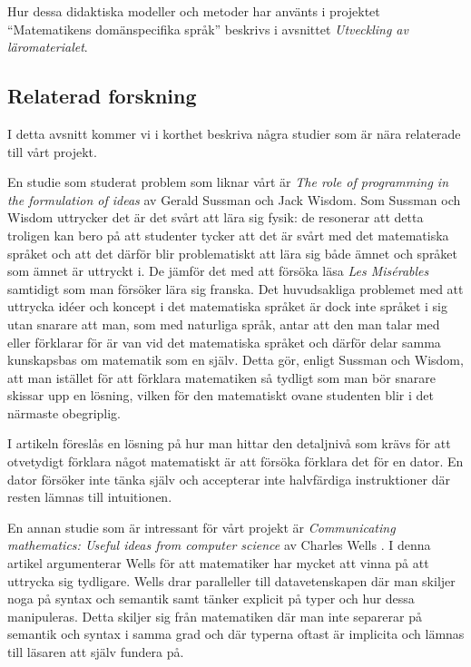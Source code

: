 \documentclass[12pt,a4paper,twoside,openright]{article}
\begin{document}
Hur dessa didaktiska modeller och metoder har använts i projektet
``Matematikens domänspecifika språk'' beskrivs i avsnittet
\textit{Utveckling av läromaterialet}.

\subsection{Relaterad forskning}
\label{sec:relForsk}
I detta avsnitt kommer vi i korthet beskriva några studier som
är nära relaterade till vårt projekt.

En studie som studerat problem som liknar vårt är \textit{The role of
  programming in the formulation of ideas} \cite{sussman2002role} av
Gerald Sussman och Jack Wisdom.  Som Sussman och Wisdom uttrycker det
är det svårt att lära sig fysik: de resonerar att detta troligen kan
bero på att studenter tycker att det är svårt med det matematiska
språket och att det därför blir problematiskt att lära sig både ämnet
och språket som ämnet är uttryckt i. De jämför det med att försöka
läsa \textit{Les Misérables} samtidigt som man försöker lära sig
franska. Det huvudsakliga problemet med att uttrycka idéer och koncept
i det matematiska språket är dock inte språket i sig utan snarare att
man, som med naturliga språk, antar att den man talar med eller
förklarar för är van vid det matematiska språket och därför delar
samma kunskapsbas om matematik som en själv. Detta gör, enligt Sussman
och Wisdom, att man istället för att förklara matematiken så tydligt
som man bör snarare skissar upp en lösning, vilken för den matematiskt
ovane studenten blir i det närmaste obegriplig.

I artikeln föreslås en lösning på hur man hittar den detaljnivå som
krävs för att otvetydigt förklara något matematiskt är att försöka
förklara det för en dator. En dator försöker inte tänka själv och
accepterar inte halvfärdiga instruktioner där resten lämnas till
intuitionen.

En annan studie som är intressant för vårt projekt är
\textit{Communicating mathematics: Useful ideas from computer science}
av Charles Wells \cite{wells1995communicating}. I denna artikel
argumenterar Wells för att matematiker har mycket att vinna på att
uttrycka sig tydligare. Wells drar paralleller till datavetenskapen
där man skiljer noga på syntax och semantik samt tänker explicit på
typer och hur dessa manipuleras. Detta skiljer sig från matematiken
där man inte separerar på semantik och syntax i samma grad och där
typerna oftast är implicita och lämnas till läsaren att själv fundera
på.
\end{document}
